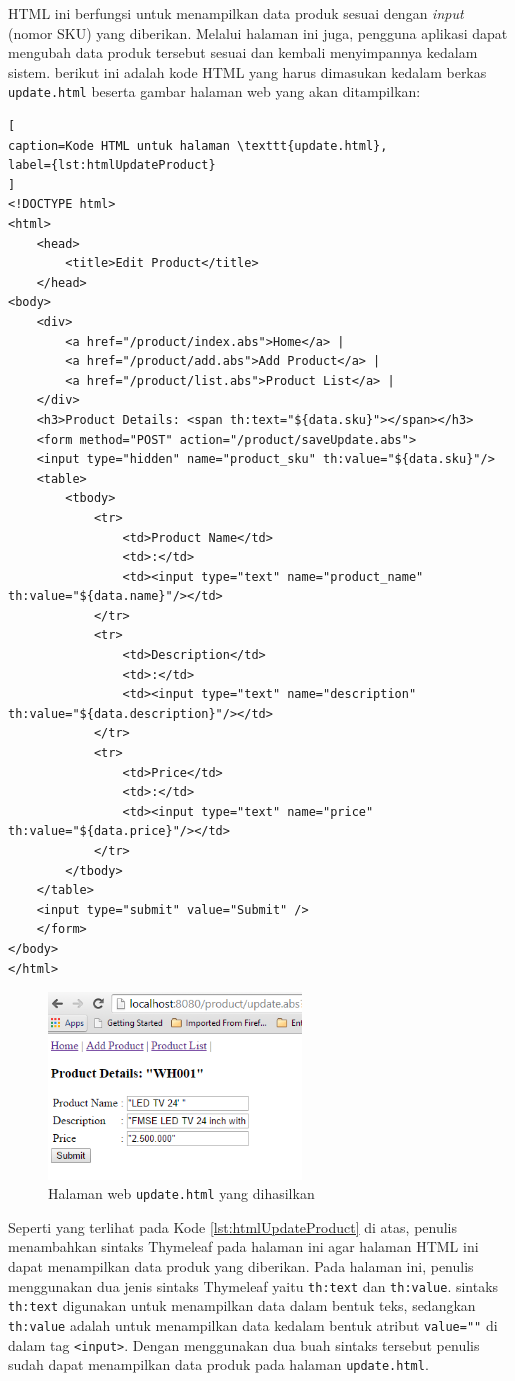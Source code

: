 HTML ini berfungsi untuk menampilkan data produk sesuai dengan \textit{input} (nomor SKU) yang diberikan. Melalui halaman ini juga, pengguna aplikasi dapat mengubah data produk tersebut sesuai dan kembali menyimpannya kedalam sistem. berikut ini adalah kode HTML yang harus dimasukan kedalam berkas \texttt{update.html} beserta gambar halaman web yang akan ditampilkan:

\begin{lstlisting}[
caption=Kode HTML untuk halaman \texttt{update.html},
label={lst:htmlUpdateProduct}
]
<!DOCTYPE html>
<html>
	<head>
		<title>Edit Product</title>
	</head>
<body>
	<div>
		<a href="/product/index.abs">Home</a> |
		<a href="/product/add.abs">Add Product</a> |
		<a href="/product/list.abs">Product List</a> |
	</div>
	<h3>Product Details: <span th:text="${data.sku}"></span></h3>
	<form method="POST" action="/product/saveUpdate.abs">
	<input type="hidden" name="product_sku" th:value="${data.sku}"/>
	<table>
		<tbody>
			<tr>
				<td>Product Name</td>
				<td>:</td>
				<td><input type="text" name="product_name" th:value="${data.name}"/></td>
			</tr>
			<tr>
				<td>Description</td>
				<td>:</td>
				<td><input type="text" name="description" th:value="${data.description}"/></td>
			</tr>
			<tr>
				<td>Price</td>
				<td>:</td>
				<td><input type="text" name="price" th:value="${data.price}"/></td>
			</tr>
		</tbody>
	</table>
	<input type="submit" value="Submit" />
	</form>
</body>
</html>
\end{lstlisting}

\begin{figure}
    \centering
    \includegraphics[width=0.6\textwidth]{img/hasil-update.png}
    \caption{Halaman web \texttt{update.html} yang dihasilkan}
    \label{fig:htmlUpdate}
\end{figure}

Seperti yang terlihat pada Kode \ref{lst:htmlUpdateProduct} di atas, penulis menambahkan sintaks Thymeleaf pada halaman ini agar halaman HTML ini dapat menampilkan data produk yang diberikan. Pada halaman ini, penulis menggunakan dua jenis sintaks Thymeleaf yaitu \texttt{th:text} dan \texttt{th:value}. sintaks \texttt{th:text} digunakan untuk menampilkan data dalam bentuk teks, sedangkan \texttt{th:value} adalah untuk menampilkan data kedalam bentuk atribut \texttt{value=""} di dalam tag \texttt{<input>}. Dengan menggunakan dua buah sintaks tersebut penulis sudah dapat menampilkan data produk pada halaman \texttt{update.html}.

